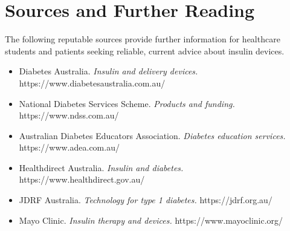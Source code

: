 \section*{Sources and Further Reading}
The following reputable sources provide further information for healthcare students and patients seeking reliable, current advice about insulin devices.
\begin{itemize}
    \item Diabetes Australia. \textit{Insulin and delivery devices.} https://www.diabetesaustralia.com.au/
    \item National Diabetes Services Scheme. \textit{Products and funding.} https://www.ndss.com.au/
    \item Australian Diabetes Educators Association. \textit{Diabetes education services.} https://www.adea.com.au/
    \item Healthdirect Australia. \textit{Insulin and diabetes.} https://www.healthdirect.gov.au/
    \item JDRF Australia. \textit{Technology for type 1 diabetes.} https://jdrf.org.au/
    \item Mayo Clinic. \textit{Insulin therapy and devices.} https://www.mayoclinic.org/
\end{itemize}
